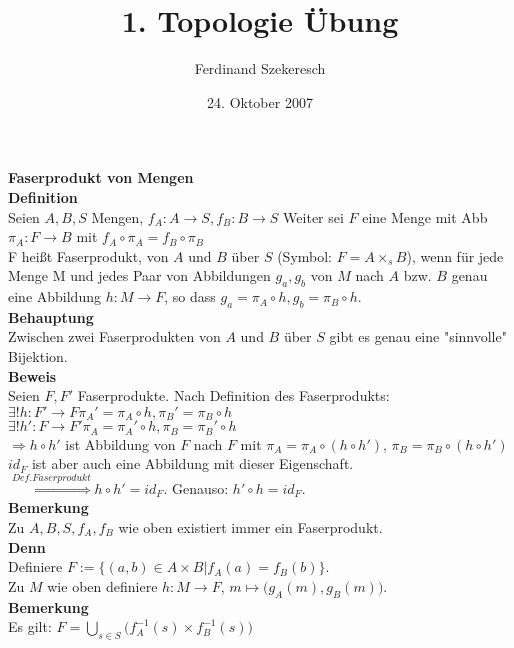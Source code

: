 \documentclass{article}
\title{1. Topologie Übung}
\author{Ferdinand Szekeresch}
\date{24. Oktober 2007}
\begin{document}
\maketitle

\textbf{Faserprodukt von Mengen}\\
\textbf{Definition}\\
Seien $A,B,S$ Mengen, $f_A : A \rightarrow S, f_B: B \rightarrow S$ Weiter sei $F$ eine Menge mit Abb $\pi_A : F \rightarrow B$ mit $f_A \circ \pi_A = f_B \circ \pi_B$ \\
F heißt Faserprodukt, von $A$ und $B$ über $S$ (Symbol: $F = A\times_sB$), wenn für jede Menge M und jedes Paar von Abbildungen $g_a,g_b$ von $M$ nach $A$ bzw. $B$ genau eine Abbildung $h: M \rightarrow F$, so dass $g_a = \pi_A \circ h, g_b = \pi_B \circ h$. \\
\textbf{Behauptung}\\
Zwischen zwei Faserprodukten von $A$ und $B$ über $S$ gibt es genau eine "sinnvolle" Bijektion.\\
\textbf{Beweis}\\
Seien $F,F'$ Faserprodukte. Nach Definition des Faserprodukts:\\
$\exists ! h: F' \rightarrow F \pi_A' = \pi_A\circ h, \pi_B' = \pi_B\circ h$\\
$\exists ! h': F \rightarrow F' \pi_A = \pi_A'\circ h, \pi_B = \pi_B'\circ h$\\
$\Rightarrow h\circ h'$ ist Abbildung von $F$ nach $F$ mit $\pi_A = \pi_A\circ (h\circ h')$, $\pi_B = \pi_B\circ (h\circ h')$
$id_F$ ist aber auch eine Abbildung mit dieser Eigenschaft.\\
$\stackrel{Def. Faserprodukt}{\Rightarrow} h \circ h' = id_F$. Genauso: $h' \circ h = id_F$.\\
\textbf{Bemerkung}\\
Zu $A,B,S,f_A,f_B$ wie oben existiert immer ein Faserprodukt.\\
\textbf{Denn}\\
Definiere $F:=\{(a,b)\in A\times B | f_A(a) = f_B(b)\}$.\\
Zu $M$ wie oben definiere $h:M\rightarrow F$, $m \mapsto\big(g_A(m),g_B(m)\big)$.\\
\textbf{Bemerkung}\\
Es gilt: $F = \bigcup\limits_{s\in S}\big(f_A^{-1}(s)\times f_B^{-1}(s)\big)$
\end{document}
